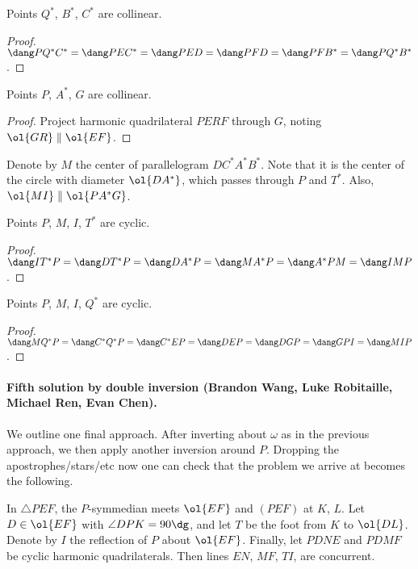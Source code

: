 \begin{claim*}
  Points $Q^\ast$, $B^\ast$, $C^\ast$ are collinear.
\end{claim*}
\begin{proof}
  $\dang PQ^\ast C^\ast = \dang PEC^\ast = \dang PED = \dang PFD
  = \dang PFB^\ast = \dang PQ^\ast B^\ast$.
\end{proof}

\begin{claim*}
  [cf Brazil 2011/5]
  Points $P$, $A^\ast$, $G$ are collinear.
\end{claim*}
\begin{proof}
  Project harmonic quadrilateral $PERF$ through $G$,
  noting $\ol{GR} \parallel \ol{EF}$.
\end{proof}

Denote by $M$ the center of parallelogram $DC^\ast A^\ast B^\ast$.
Note that it is the center of the circle with
diameter $\ol{DA^\ast}$, which passes through $P$ and $T^\ast$.
Also, $\ol{MI} \parallel \ol{PA^\ast G}$.

\begin{claim*}
  Points $P$, $M$, $I$, $T^\ast$ are cyclic.
\end{claim*}
\begin{proof}
  $\dang IT^\ast P = \dang D T^\ast P = \dang DA^\ast P
    = \dang M A^\ast P = \dang A^\ast P M  = \dang IMP$.
\end{proof}

\begin{claim*}
  Points $P$, $M$, $I$, $Q^\ast$ are cyclic.
\end{claim*}
\begin{proof}
  $\dang MQ^\ast P = \dang C^\ast Q^\ast P = \dang C^\ast E P
  = \dang D E P = \dang D G P = \dang GPI = \dang MIP$.
\end{proof}

\paragraph{Fifth solution by double inversion (Brandon Wang, Luke Robitaille, Michael Ren, Evan Chen).}
We outline one final approach.
After inverting about $\omega$ as in the previous approach,
we then apply another inversion around $P$.
Dropping the apostrophes/stars/etc now one can check
that the problem we arrive at becomes the following.
\begin{proposition*}
  In $\triangle PEF$, the $P$-symmedian meets $\ol{EF}$
  and $(PEF)$ at $K$, $L$.
  Let $D \in \ol{EF}$ with $\angle DPK = 90\dg$,
  and let $T$ be the foot from $K$ to $\ol{DL}$.
  Denote by $I$ the reflection of $P$ about $\ol{EF}$.
  Finally, let $PDNE$ and $PDMF$ be cyclic harmonic quadrilaterals.
  Then lines $EN$, $MF$, $TI$, are concurrent.
\end{proposition*}

